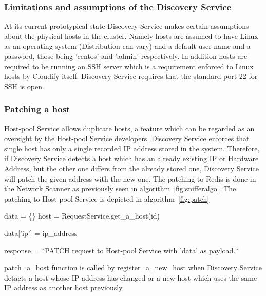 \subsubsection{Limitations and assumptions of the Discovery Service}

At its current prototypical state Discovery Service makes certain assumptions about the physical hosts in the cluster.
Namely hosts are assumed to have Linux as an operating system (Distribution can vary) and a default user name and a password, those being 'centos' and 'admin' respectively. In addition hosts are required to be running an SSH server which is a requirement enforced to Linux hosts by Cloudify itself. Discovery Service requires that the standard port 22 for SSH is open.

\subsubsection{Patching a host}

Host-pool Service allows duplicate hosts, a feature which can be regarded as an oversight by the Host-pool Service developers. Discovery Service enforces that single host has only a single recorded IP address stored in the system. Therefore, if Discovery Service detects a host which has an already existing IP or Hardware Address, but the other one differs from the already stored one, Discovery Service will patch the given address with the new one. The patching to Redis is done in the Network Scanner as previously seen in algorithm~\ref{fig:snifferalgo}. The patching to Host-pool Service is depicted in algorithm~\ref{fig:patch}

\begin{center}
\begin{algorithm}[H]
\label{fig:patch}
\setlength{\AlCapSkip}{1em}
\begin{center}
\end{center}

data = \{\}\;
host = RequestService.get\_a\_host(id)\;

 {
	data['ip'] = ip\_address\;
} 

response = *PATCH request to Host-pool Service with 'data' as payload.*\;

\caption{patch\_a\_host function is called by register\_a\_new\_host when Discovery Service detacts a host whose IP address has changed or a new host which uses the same IP address as another host previously.}

\end{algorithm}
\end{center}

